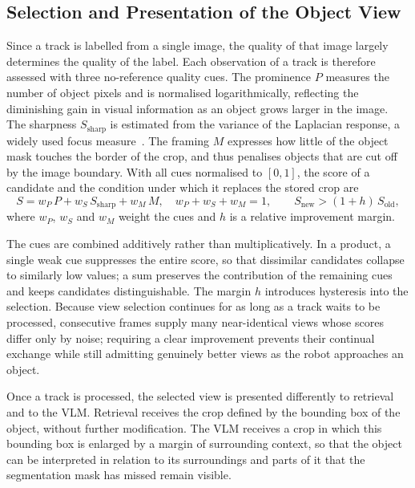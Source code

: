 \subsection{Selection and Presentation of the Object View}
\label{subsec:method_view_selection}

{\small

Since a track is labelled from a single image, the quality of that image largely determines the quality of the label. Each observation of a track is therefore assessed with three no-reference quality cues. The prominence $P$ measures the number of object pixels and is normalised logarithmically, reflecting the diminishing gain in visual information as an object grows larger in the image. The sharpness $S_{\mathrm{sharp}}$ is estimated from the variance of the Laplacian response, a widely used focus measure~\cite{pechpacheco2000laplacian}. The framing $M$ expresses how little of the object mask touches the border of the crop, and thus penalises objects that are cut off by the image boundary. With all cues normalised to $[0,1]$, the score of a candidate and the condition under which it replaces the stored crop are
\begin{equation}
S = w_P\,P + w_S\,S_{\mathrm{sharp}} + w_M\,M, \quad w_P + w_S + w_M = 1, \qquad S_{\mathrm{new}} > (1+h)\,S_{\mathrm{old}},
\label{eq:crop_score}
\end{equation}
where $w_P$, $w_S$ and $w_M$ weight the cues and $h$ is a relative improvement margin.

The cues are combined additively rather than multiplicatively. In a product, a single weak cue suppresses the entire score, so that dissimilar candidates collapse to similarly low values; a sum preserves the contribution of the remaining cues and keeps candidates distinguishable. The margin $h$ introduces hysteresis into the selection. Because view selection continues for as long as a track waits to be processed, consecutive frames supply many near-identical views whose scores differ only by noise; requiring a clear improvement prevents their continual exchange while still admitting genuinely better views as the robot approaches an object.

Once a track is processed, the selected view is presented differently to retrieval and to the VLM. Retrieval receives the crop defined by the bounding box of the object, without further modification. The VLM receives a crop in which this bounding box is enlarged by a margin of surrounding context, so that the object can be interpreted in relation to its surroundings and parts of it that the segmentation mask has missed remain visible.

}
